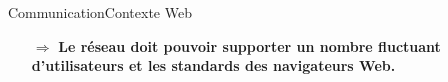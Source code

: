 

\begin{frame}{Communication}{Contexte Web}






  



 
  \large
  \begin{itemize}
  \item [$\Rightarrow$]
    \textbf{Le réseau doit pouvoir supporter un nombre
      fluctuant d'utilisateurs et les standards des navigateurs Web.}
  \end{itemize}

\end{frame}




